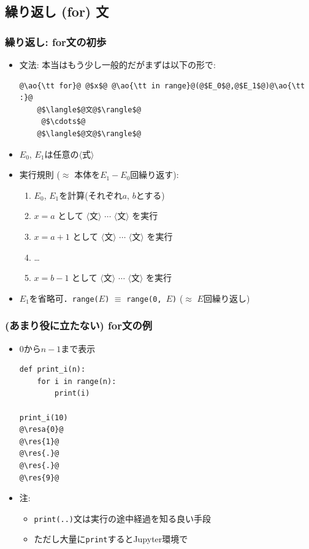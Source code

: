 \documentclass[10pt,dvipdfmx]{beamer}
\newcommand{\ore}[1]{{\color{orange}#1}}
\newcommand{\ao}[1]{{\color{blue}#1}}
\newcommand{\resa}[1]{\ore{\textsl{$\rightarrow$ #1}}}
\newcommand{\res}[1]{\ore{\textsl{#1}}}
\begin{document}
\subsection{繰り返し (for) 文}

\begin{frame}[fragile]
\frametitle{繰り返し: for文の初歩}
\begin{itemize}
\item 文法: 本当はもう少し一般的だがまずは以下の形で:
\begin{lstlisting}
@\ao{\tt for}@ @$x$@ @\ao{\tt in range}@(@$E_0$@,@$E_1$@)@\ao{\tt :}@
    @$\langle$@文@$\rangle$@    
     @$\cdots$@
    @$\langle$@文@$\rangle$@    
\end{lstlisting}
\item $E_0$, $E_1$は任意の$\langle$式$\rangle$
\item 実行規則 ($\approx$ 本体を$E_1 - E_0$回繰り返す): 
  \begin{enumerate}
  \item $E_0$, $E_1$を計算(それぞれ$a$, $b$とする)
  \item $x = a$ として $\langle$文$\rangle$ $\cdots$ $\langle$文$\rangle$ を実行
  \item $x = a + 1$ として $\langle$文$\rangle$ $\cdots$ $\langle$文$\rangle$ を実行
  \item \ldots
  \item $x = b - 1$ として $\langle$文$\rangle$ $\cdots$ $\langle$文$\rangle$ を実行
  \end{enumerate}

\item $E_1$を省略可．{\tt range($E$)} $\equiv$ {\tt range(0, $E$)}
($\approx$ $E$回繰り返し)
\end{itemize}
\end{frame}

\begin{frame}[fragile]
\frametitle{(あまり役に立たない) for文の例}
\begin{itemize}
\item 0から$n-1$まで表示
\begin{lstlisting}
def print_i(n):
    for i in range(n):
        print(i)

print_i(10)
@\resa{0}@
@\res{1}@
@\res{.}@
@\res{.}@
@\res{9}@
\end{lstlisting}

\item 注:
  \begin{itemize}
  \item {\tt print(..)}文は実行の途中経過を知る良い手段
  \item ただし大量に{\tt print}するとJupyter環境で
  \end{itemize}
\end{itemize}
\end{frame}
\end{document}
